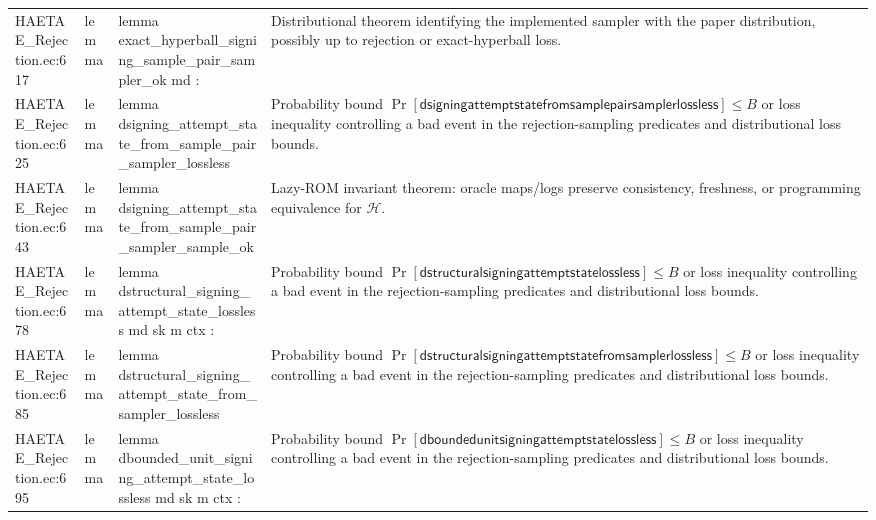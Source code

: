 \documentclass[10pt]{article}
\begin{document}
\begin{longtable}{L{0.11\textwidth}L{0.055\textwidth}L{0.385\textwidth}L{0.41\textwidth}}
HAETAE\_\allowbreak{}Rejection.\allowbreak{}ec:\allowbreak{}617 & lemma & {\ttfamily\scriptsize lemma exact\_\allowbreak{}hyperball\_\allowbreak{}signing\_\allowbreak{}sample\_\allowbreak{}pair\_\allowbreak{}sampler\_\allowbreak{}ok md :} & Distributional theorem identifying the implemented sampler with the paper distribution, possibly up to rejection or exact-hyperball loss. \\
HAETAE\_\allowbreak{}Rejection.\allowbreak{}ec:\allowbreak{}625 & lemma & {\ttfamily\scriptsize lemma dsigning\_\allowbreak{}attempt\_\allowbreak{}state\_\allowbreak{}from\_\allowbreak{}sample\_\allowbreak{}pair\_\allowbreak{}sampler\_\allowbreak{}lossless} & Probability bound $\Pr[\mathsf{dsigningattemptstatefromsamplepairsamplerlossless}]\le B$ or loss inequality controlling a bad event in the rejection-sampling predicates and distributional loss bounds. \\
HAETAE\_\allowbreak{}Rejection.\allowbreak{}ec:\allowbreak{}643 & lemma & {\ttfamily\scriptsize lemma dsigning\_\allowbreak{}attempt\_\allowbreak{}state\_\allowbreak{}from\_\allowbreak{}sample\_\allowbreak{}pair\_\allowbreak{}sampler\_\allowbreak{}sample\_\allowbreak{}ok} & Lazy-ROM invariant theorem: oracle maps/logs preserve consistency, freshness, or programming equivalence for $\mathcal H$. \\
HAETAE\_\allowbreak{}Rejection.\allowbreak{}ec:\allowbreak{}678 & lemma & {\ttfamily\scriptsize lemma dstructural\_\allowbreak{}signing\_\allowbreak{}attempt\_\allowbreak{}state\_\allowbreak{}lossless md sk m ctx :} & Probability bound $\Pr[\mathsf{dstructuralsigningattemptstatelossless}]\le B$ or loss inequality controlling a bad event in the rejection-sampling predicates and distributional loss bounds. \\
HAETAE\_\allowbreak{}Rejection.\allowbreak{}ec:\allowbreak{}685 & lemma & {\ttfamily\scriptsize lemma dstructural\_\allowbreak{}signing\_\allowbreak{}attempt\_\allowbreak{}state\_\allowbreak{}from\_\allowbreak{}sampler\_\allowbreak{}lossless} & Probability bound $\Pr[\mathsf{dstructuralsigningattemptstatefromsamplerlossless}]\le B$ or loss inequality controlling a bad event in the rejection-sampling predicates and distributional loss bounds. \\
HAETAE\_\allowbreak{}Rejection.\allowbreak{}ec:\allowbreak{}695 & lemma & {\ttfamily\scriptsize lemma dbounded\_\allowbreak{}unit\_\allowbreak{}signing\_\allowbreak{}attempt\_\allowbreak{}state\_\allowbreak{}lossless md sk m ctx :} & Probability bound $\Pr[\mathsf{dboundedunitsigningattemptstatelossless}]\le B$ or loss inequality controlling a bad event in the rejection-sampling predicates and distributional loss bounds. \\

\end{longtable}
\end{document}
